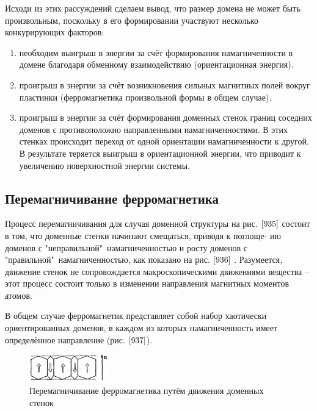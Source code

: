 \documentclass[a4paper,14pt]{article} %
\begin{document}
Исходи из этих рассуждений сделаем вывод, что размер домена не может быть произвольным, поскольку в его формировании участвуют несколько конкурирующих факторов:
\begin{enumerate}
    \item необходим выигрыш в энергии за счёт формирования намагниченности в домене благодаря обменному взаимодействию ($\textbf{ориентационная энергия}$).
    \item проигрыш в энергии за счёт возникновения сильных магнитных полей вокруг пластинки (ферромагнетика произвольной формы в общем случае).
    \item проигрыш в энергии за счёт формирования доменных стенок границ соседних доменов с противоположно направленными намагниченностями. В этих стенках происходит переход от одной ориентации намагниченности к другой. В результате теряется выигрыш в ориентационной энергии, что приводит к увеличению поверхностной энергии системы.
\end{enumerate}

\subsection{Перемагничивание ферромагнетика}

Процесс перемагничивания для случая доменной структуры на рис. $\ref{935}$ состоит в том, что доменные стенки начинают смещаться, приводя к $\textbf{поглоще-}$ $\textbf{ию}$ доменов с "неправильной"\ намагниченностью и $\textbf{росту}$ доменов с "правильной"\ намагниченностью, как показано на рис. $\ref{936}$ . Разумеется, движение стенок не сопровождается макроскопическими движениями вещества -- этот процесс состоит только в изменении направления магнитных моментов атомов.

В общем случае ферромагнетик представляет собой набор хаотически ориентированных доменов, в каждом из которых намагниченность имеет определённое направление (рис. $\ref{937}$).

\begin{figure}[h!]

\begin{center}
\includegraphics[width=0.3\textwidth]{9.3.6.png} 
\end{center}
\caption{Перемагничивание ферромагнетика путём движения доменных стенок}
\label{936}
\end{figure}
\end{document}
